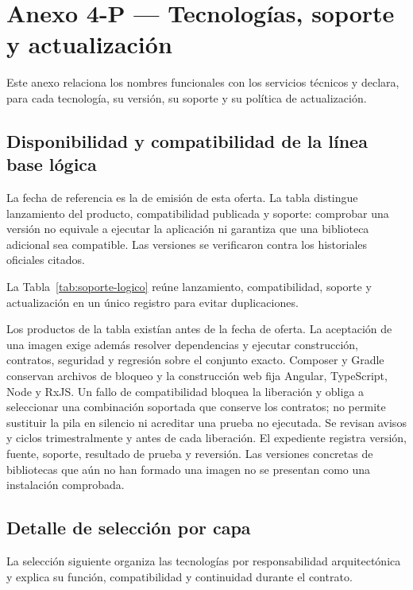 \clearpage
\section*{Anexo 4-P — Tecnologías, soporte y actualización}
\label{fuente-19-anexo-4-1-p-tecnologias-soporte}
\label{anx:P}

Este anexo relaciona los nombres funcionales con los servicios técnicos y declara, para cada tecnología, su versión, su soporte y su política de actualización.
\subsection*{Disponibilidad y compatibilidad de la línea base lógica}
La fecha de referencia es la de emisión de esta oferta. La tabla distingue lanzamiento del producto, compatibilidad publicada y soporte: comprobar una versión no equivale a ejecutar la aplicación ni garantiza que una biblioteca adicional sea compatible. Las versiones se verificaron contra los historiales oficiales citados.

La Tabla~\ref{tab:soporte-logico} reúne lanzamiento, compatibilidad, soporte y actualización en un único registro para evitar duplicaciones.



Los productos de la tabla existían antes de la fecha de oferta. La aceptación de una imagen exige además resolver dependencias y ejecutar construcción, contratos, seguridad y regresión sobre el conjunto exacto. Composer y Gradle conservan archivos de bloqueo y la construcción web fija Angular, TypeScript, Node y RxJS. Un fallo de compatibilidad bloquea la liberación y obliga a seleccionar una combinación soportada que conserve los contratos; no permite sustituir la pila en silencio ni acreditar una prueba no ejecutada. Se revisan avisos y ciclos trimestralmente y antes de cada liberación. El expediente registra versión, fuente, soporte, resultado de prueba y reversión. Las versiones concretas de bibliotecas que aún no han formado una imagen no se presentan como una instalación comprobada.

\subsection*{Detalle de selección por capa}

La selección siguiente organiza las tecnologías por responsabilidad arquitectónica y explica su función, compatibilidad y continuidad durante el contrato.

